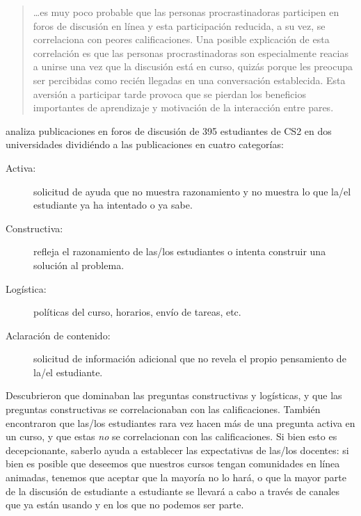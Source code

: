 \begin{quote}

  {\ldots}es muy poco probable que las personas procrastinadoras participen en foros de discusión en línea
  y esta participación reducida,
  a su vez,
  se correlaciona con peores calificaciones.
  Una posible explicación de esta correlación es que
  las personas procrastinadoras son especialmente reacias a unirse una vez que la discusión está en curso,
  quizás porque les preocupa ser percibidas como recién llegadas en una conversación establecida.
  Esta aversión a participar tarde
  provoca que se pierdan los beneficios importantes de aprendizaje y motivación de la interacción entre pares.

\end{quote}

\cite{Vell2017} analiza publicaciones en foros de discusión de 395 estudiantes de CS2 en dos universidades
dividiéndo a las publicaciones en cuatro categorías:

\begin{description}

\item[Activa:]
  solicitud de ayuda que no muestra razonamiento
  y no muestra lo que la/el estudiante ya ha intentado o ya sabe.

\item[Constructiva:]
  refleja el razonamiento de las/los estudiantes
  o intenta construir una solución al problema.

\item[Logística:]
  políticas del curso, horarios, envío de tareas, etc.
 
\item[Aclaración de contenido:]
  solicitud de información adicional
  que no revela el propio pensamiento de la/el estudiante.

\end{description}

Descubrieron que dominaban las preguntas constructivas y logísticas,
y que las preguntas constructivas se correlacionaban con las calificaciones.
También encontraron que las/los estudiantes rara vez hacen más de una pregunta activa en un curso,
y que estas \emph{no} se correlacionan con las calificaciones.
Si bien esto es decepcionante,
saberlo ayuda a establecer las expectativas de las/los docentes:
si bien es posible que deseemos que nuestros cursos tengan comunidades en línea animadas,
tenemos que aceptar que la mayoría no lo hará,
o que la mayor parte de la discusión de estudiante a estudiante se llevará a cabo
a través de canales que ya están usando
y en los que no podemos ser parte.

